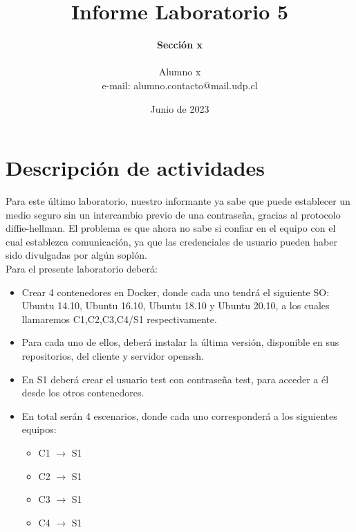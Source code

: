 \documentclass[letter,12pt]{article}
\begin{document}
%
   \title{\Huge{Informe Laboratorio 5}}

   \author{\textbf{Sección x} \\  \\Alumno x \\ e-mail: alumno.contacto@mail.udp.cl}
          
   \date{Junio de 2023}

   \maketitle
   
   \tableofcontents
 
  \newpage
  

\section{Descripción de actividades}
Para este último laboratorio, nuestro informante ya sabe que puede establecer un medio seguro sin un intercambio previo de una contraseña, gracias al protocolo diffie-hellman. El problema es que ahora no sabe si confiar en el equipo con el cual establezca comunicación, ya que las credenciales de usuario pueden haber sido divulgadas por algún soplón.\\

Para el presente laboratorio deberá:

\begin{itemize}
    \item Crear 4 contenedores en Docker, donde cada uno tendrá el siguiente SO:
        Ubuntu 14.10, Ubuntu 16.10, Ubuntu 18.10 y Ubuntu 20.10, a los cuales llamaremos C1,C2,C3,C4/S1 respectivamente.
        
    \item Para cada uno de ellos, deberá instalar la última versión, disponible en sus repositorios, del cliente y servidor openssh.

    \item En S1 deberá crear el usuario test con contraseña test, para acceder a él desde los otros contenedores.
    
    \item En total serán 4 escenarios, donde cada uno corresponderá a los siguientes equipos:
    \begin{itemize}
        \item C1 $\rightarrow$ S1
        \item C2 $\rightarrow$ S1
        \item C3 $\rightarrow$ S1
        \item C4 $\rightarrow$ S1
    \end{itemize}
\end{itemize}
\end{document}
